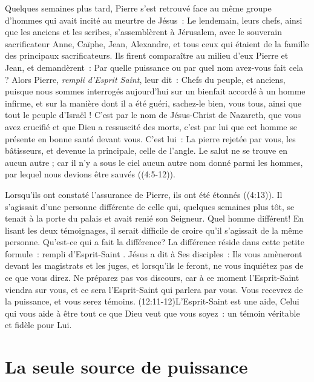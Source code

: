 \begin{specialpar}{}
Quelques semaines plus tard, Pierre s'est retrouvé face au même groupe
 d'hommes qui avait incité au meurtre de Jésus~:
 \og Le lendemain, leurs chefs, ainsi que les anciens et les scribes,
 s'assemblèrent à Jérusalem, avec le souverain sacrificateur Anne,
 Caïphe, Jean, Ale\-xandre, et tous ceux qui étaient de la famille
 des principaux sacrificateurs. Ils firent comparaître au milieu d'eux
 Pierre et Jean, et demandèrent~: Par quelle puissance ou par quel nom
 avez-vous fait cela ? Alors Pierre, \emph{rempli d'Esprit Saint}, leur dit~:
 Chefs du peuple, et anciens, puisque nous sommes interrogés aujourd'hui
 sur un bienfait accordé à un homme infirme, et sur la manière
 dont il a été guéri, sachez-le bien, vous tous, ainsi que tout le peuple
 d'Israël ! C'est par le nom de Jésus-Christ de Nazareth, que vous avez
 crucifié et que Dieu a ressuscité des morts, c'est par lui que cet homme
 se présente en bonne santé devant vous. C'est lui~: La pierre rejetée
 par vous, les bâtisseurs, et devenue la principale, celle de l'angle.
 Le salut ne se trouve en aucun autre ; car il n'y a sous le ciel aucun
 autre nom donné parmi les hommes, par lequel nous devions être
 sauvés \fg{} ((4:5-12)).
\end{specialpar}

\begin{specialpar}{}
Lorsqu'ils ont constaté l'assurance de Pierre, ils ont été étonnés
 ((4:13)).
 Il s'agissait d'une personne différente
 de celle qui, quelques semaines plus tôt, se tenait à la porte du palais
 et avait renié son Seigneur. Quel homme différent!
 En lisant les deux témoignages, il serait difficile de croire
 qu'il s'agissait de la même personne. Qu'est-ce qui a fait la différence?
 La différence réside dans cette petite formule~:
 \og rempli d'Esprit-Saint \fg{}. Jésus a dit à Ses disciples~:
 \og Ils vous amèneront devant les magistrats et les juges,
 et lorsqu'ils le feront, ne vous inquiétez pas de ce que vous direz.
 Ne préparez pas vos discours, car à ce moment l'Esprit-Saint viendra
 sur vous, et ce sera l'Esprit-Saint qui parlera par vous.
 Vous recevrez de la puissance, et vous serez témoins. \fg{}
 (12:11-12)L'Esprit-Saint est une aide,
 Celui qui vous aide à être tout ce que Dieu
 veut que vous soyez~: un témoin véritable et fidèle pour Lui.
\end{specialpar}


\section{La seule source de puissance}

